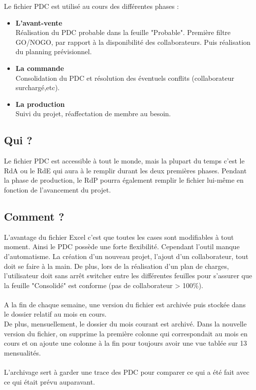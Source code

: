 \documentclass[french]{report}
\begin{document}
Le fichier PDC est utilisé au cours des différentes phases :
\begin{itemize}[label=\textbullet, font=\normalfont \color{blue}]
  \item{\bf{L'avant-vente}}\\
Réalisation du PDC probable dans la feuille "Probable". Première filtre GO/NOGO,
par rapport à la disponibilité des collaborateurs. Puis réalisation du planning
prévisionnel.
  \item{\bf{La commande}}\\
Consolidation du PDC et résolution des éventuels conflits (collaborateur
surchargé,etc).
  \item{\bf{La production}}\\
Suivi du projet, réaffectation de membre au besoin.
\end {itemize}

\vspace{0.5cm}

\subsection{Qui ?}

Le fichier PDC est accessible à tout le monde, mais la plupart du temps c'est le
RdA ou le RdE qui aura à le remplir durant les deux premières phases. Pendant la
phase de production, le RdP pourra également remplir le fichier lui-même en
fonction de l'avancement du projet.

\subsection{Comment ?}

L'avantage du fichier Excel c'est que toutes les cases sont modifiables à tout
moment. Ainsi le PDC possède une forte flexibilité. Cependant l'outil manque
d'automatisme. La création d'un nouveau projet, l'ajout d'un collaborateur, tout
doit se faire à la main. De plus, lors de la réalisation d'un plan de charges,
l'utilisateur doit sans arrêt switcher entre les  différentes feuilles pour
s'assurer que la feuille "Consolidé" est conforme (pas de collaborateur >
100\%).\\\\
A la fin de chaque semaine, une version du fichier est archivée puis stockée dans
le dossier relatif au mois en cours.\\ De plus, mensuellement, le dossier du
mois courant est archivé. Dans la nouvelle version du fichier, on supprime la
première colonne qui correspondait au mois en cours et on ajoute une colonne à
la fin pour toujours avoir une vue tablée sur 13 mensualités.\\\\ L'archivage
sert à garder une trace des PDC pour comparer ce qui a été fait avec ce qui
était prévu auparavant.
\end{document}
